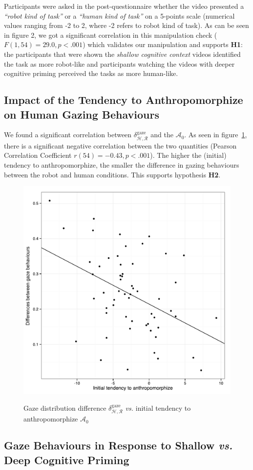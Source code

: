 \documentclass[lettersize, noapacite, twoside, HRI]{apa_HRI}
\newcommand{\vs}{\textit{vs.}\xspace}
\newcommand{\h}[1]{\textbf{H#1}\xspace}
\newcommand{\anti}{{$\mathcal{A}_0$\xspace}}
\begin{document}
Participants were asked in the post-questionnaire whether the video presented a
\emph{``robot kind of task''} or a \emph{``human kind of task''} on a 5-points
scale (numerical values ranging from -2 to 2, where -2 refers to robot kind of
task). As can be seen in figure 2, we got a significant correlation in this
manipulation check ($F(1,54) = 29.0, p < .001$) which validates our manipulation
and supports \h{1}: the participants that were shown the \emph{shallow cognitive
context} videos identified the task as more robot-like and participants watching
the videos with deeper cognitive priming perceived the tasks as more human-like. 


\subsection{Impact of the Tendency to Anthropomorphize on Human
Gazing Behaviours}

We found a significant correlation between
$\delta_{\mathcal{H},\mathcal{R}}^{\text{gaze}}$ and
the \anti{}. As seen in figure~\ref{h2}, there is a significant negative
correlation between the two quantities (Pearson Correlation Coefficient $r(54) = -0.43,
p < .001$). The higher the (initial) tendency to anthropomorphize, the smaller
the difference in gazing behaviours between the robot and human conditions. This
supports hypothesis \h{2}.

\begin{figure}
    \centering
    \includegraphics[width=0.5\columnwidth]{H2}\label{GazeDifference-vs-ICA}
    \caption{Gaze distribution difference $\delta_{\mathcal{H},
    \mathcal{R}}^{\text{gaze}}$ \vs initial tendency to anthropomorphize \anti{}}
    \label{h2}
\end{figure}

\subsection{Gaze Behaviours in Response to Shallow \vs Deep Cognitive Priming}
\end{document}
